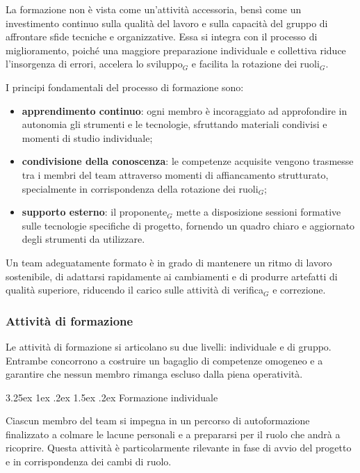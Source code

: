 \documentclass[a4paper, 10pt]{article}
\makeatletter
\renewcommand\paragraph{\@startsection{paragraph}{4}{\z@}%
  {3.25ex \@plus1ex \@minus .2ex}%
  {1.5ex \@plus .2ex}%
  {\normalfont\normalsize\bfseries}}
\makeatother
\begin{document}
La formazione non è vista come un'attività accessoria, bensì come un investimento continuo sulla qualità del lavoro e sulla capacità del gruppo di affrontare sfide tecniche e organizzative. Essa si integra con il processo di miglioramento, poiché una maggiore preparazione individuale e collettiva riduce l'insorgenza di errori, accelera lo sviluppo$_G$ e facilita la rotazione dei ruoli$_G$.

I principi fondamentali del processo di formazione sono:
\begin{itemize}
    \item \textbf{apprendimento continuo}: ogni membro è incoraggiato ad approfondire in autonomia gli strumenti e le tecnologie, sfruttando materiali condivisi e momenti di studio individuale;
    \item \textbf{condivisione della conoscenza}: le competenze acquisite vengono trasmesse tra i membri del team attraverso momenti di affiancamento strutturato, specialmente in corrispondenza della rotazione dei ruoli$_G$;
    \item \textbf{supporto esterno}: il proponente$_G$ mette a disposizione sessioni formative sulle tecnologie specifiche di progetto, fornendo un quadro chiaro e aggiornato degli strumenti da utilizzare.
\end{itemize}

Un team adeguatamente formato è in grado di mantenere un ritmo di lavoro sostenibile, di adattarsi rapidamente ai cambiamenti e di produrre artefatti di qualità superiore, riducendo il carico sulle attività di verifica$_G$ e correzione.

\subsubsection{Attività di formazione}
\label{subsubsec:attivita_formazione}

Le attività di formazione si articolano su due livelli: individuale e di gruppo. Entrambe concorrono a costruire un bagaglio di competenze omogeneo e a garantire che nessun membro rimanga escluso dalla piena operatività.

\paragraph{Formazione individuale}

Ciascun membro del team si impegna in un percorso di autoformazione finalizzato a colmare le lacune personali e a prepararsi per il ruolo che andrà a ricoprire. Questa attività è particolarmente rilevante in fase di avvio del progetto e in corrispondenza dei cambi di ruolo.
\end{document}
